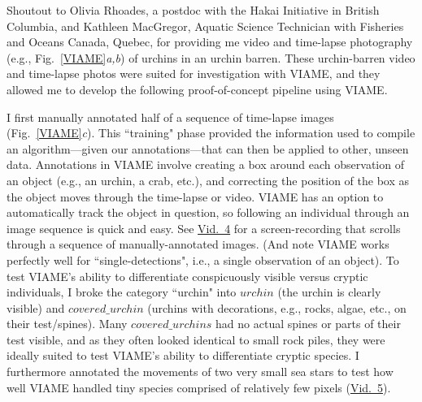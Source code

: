 \documentclass[11pt]{article}
\begin{document}
Shoutout to Olivia Rhoades, a postdoc with the Hakai Initiative in 
British Columbia, and Kathleen MacGregor, Aquatic Science Technician 
with Fisheries and Oceans Canada, Quebec, for providing me video and 
time-lapse photography (e.g., Fig.~\ref{VIAME}\textit{a,b}) of urchins 
in an urchin barren. 
These urchin-barren video and time-lapse photos were suited for 
investigation with VIAME, and they allowed me to develop the 
following proof-of-concept pipeline using VIAME. 

I first manually annotated half of a sequence of time-lapse images 
(Fig.~\ref{VIAME}\textit{c}).
This ``training" phase provided the information used to compile an 
algorithm---given our annotations---that can then be applied to other, 
unseen data. 
Annotations in VIAME involve creating a box around each observation of 
an object (e.g., an urchin, a crab, etc.), and correcting the position 
of the box as the object moves through the time-lapse or video.
VIAME has an option to automatically track the object in question, so 
following an individual through an image sequence is quick and easy. 
See 
\href{https://drive.google.com/file/d/12ubZDY16TSiEoi-b2XBXuypyJKBuxcDt/view?usp=sharing}{Vid.~4}
 for a screen-recording that scrolls through a sequence of 
 manually-annotated images.
(And note VIAME works perfectly well for ``single-detections", i.e., a 
single observation of an object).   
To test VIAME's ability to differentiate conspicuously visible versus 
cryptic individuals, I broke the category ``urchin" into $urchin$ (the 
urchin is clearly visible) and $covered\_urchin$ (urchins with 
decorations, e.g., rocks, algae, etc., on their test/spines). 
Many $covered\_urchins$ had no actual spines or parts of their 
test visible, and as they often looked identical to small rock piles, 
they were ideally suited to test VIAME's ability to differentiate 
cryptic species.
I furthermore annotated the movements of two very small sea stars 
to test how well VIAME handled tiny species comprised of relatively 
few pixels 
(\href{https://drive.google.com/file/d/1Hl3GFk9CDltWZcu24yrjcqk80Kb1c5TG/view?usp=sharing}{Vid.~5}).
\end{document}
